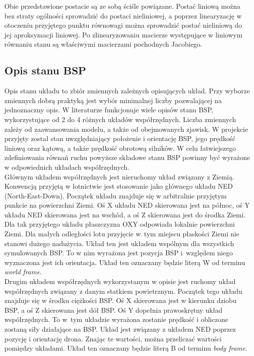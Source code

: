 Obie przedstawione postacie są ze sobą ściśle powiązane. Postać liniową można bez straty ogólności sprowadzić do postaci nieliniowej, a poprzez linearyzację w otoczeniu przyjętego punktu równowagi można sprowadzić postać nieliniową do jej aproksymacji liniowej. Po zlinearyzowaniu macierze występujące w liniowym równaniu stanu są właściwymi macierzami pochodnych Jacobiego.

\subsection{Opis stanu BSP}

Opis stanu układu to zbiór zmiennych zależnych opisujących układ. Przy wyborze zmiennych dobrą praktyką jest wybór minimalnej liczby pozwalającej na jednoznaczny opis. W literaturze funkcjonuje wiele opisów stanu BSP, wykorzystujące od 2 do 4 różnych układów współrzędnych. Liczba zmiennych zależy od zaawansowania modelu, a także od obejmowanych zjawisk. W projekcie przyjęty został stan uwzględniający położenie i orientację BSP, jego prędkość liniową oraz kątową, a także prędkość obrotową silników. W celu łatwiejszego zdefiniowania równań ruchu powyższe składowe stanu BSP powinny być wyrażone w odpowiednich układach współrzędnych.\\

Głównym układem współrzędnych jest nieruchomy układ związany z Ziemią. Konwencją przyjętą w lotnictwie jest stosowanie jako głównego układu NED (North-East-Down). Początek układu znajduje się w arbitralnie przyjętym punkcie na powierzchni Ziemi. Oś X układu NED skierowana jest na północ, oś Y układu NED skierowana jest na wschód, a oś Z skierowana jest do środka Ziemi. Dla tak przyjętego układu płaszczyzna OXY odpowiada lokalnie powierzchni Ziemi. Dla małych odległości lotu przyjęcie w~tym miejscu płaskości Ziemi nie stanowi dużego nadużycia. Układ ten jest układem wspólnym dla wszystkich symulowanych BSP. To w nim wyrażona jest pozycja BSP i~względem niego wyznaczona jest ich orientacja. Układ ten oznaczany będzie literą W od terminu \textit{world frame}.\\

Drugim układem współrzędnych wykorzystanym w opisie jest ruchomy układ współrzędnych związany z danym statkiem powietrznym. Początek tego układu znajduje się w środku ciężkości BSP. Oś X skierowana jest w kierunku dziobu BSP, a oś Z skierowana jest dół BSP. Oś Y dopełnia prawoskrętny układ współrzędnych. To w~tym układzie wyrażona zostanie prędkość i obliczone zostaną siły działające na BSP. Układ jest związany z układem NED poprzez pozycję i orientację drona. Znając te wartości, można przeliczać wartości pomiędzy układami.  Układ ten oznaczany będzie literą B od terminu \textit{body frame}.

